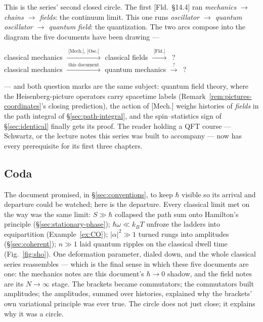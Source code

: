 \documentclass[11pt]{article}
\theoremstyle{plain}
\theoremstyle{definition}
\theoremstyle{remark}
\begin{document}
This is the series' second closed circle. The first
[Fld.\ \S14.4] ran \emph{mechanics $\to$ chains $\to$ fields}: the
continuum limit. This one runs \emph{oscillator $\to$ quantum
oscillator $\to$ quantum field}: the quantization. The two arcs
compose into the diagram the five documents have been drawing ---
\begin{center}
classical mechanics
$\xrightarrow{\;\text{[Mech.], [Osc.]}\;}$
classical fields
$\xrightarrow{\;\text{[Fld.]}\;}$~?
\\[4pt]
classical mechanics
$\xrightarrow{\;\text{this document}\;}$
quantum mechanics
$\xrightarrow{\;?\;}$~?
\end{center}
--- and both question marks are the same subject: quantum field
theory, where the Heisenberg-picture operators carry spacetime
labels (Remark~\ref{rem:pictures-coordinates}'s closing
prediction), the
action of [Mech.] weighs histories of \emph{fields} in the path
integral of \S\ref{sec:path-integral}, and the spin--statistics
sign of \S\ref{sec:identical} finally gets its proof. The reader
holding a QFT course --- Schwartz, or the lecture notes this series
was built to accompany --- now has every prerequisite for
its first three chapters.

\subsection{Coda}
\label{sec:coda}

The document promised, in \S\ref{sec:conventions}, to keep $\hbar$
visible so its arrival and departure could be watched; here is the
departure. Every classical limit met on the way was the same limit:
$S \gg \hbar$ collapsed the path sum onto Hamilton's principle
(\S\ref{sec:stationary-phase}); $\hbar\omega \ll k_BT$ unfroze the
ladders into equipartition (Example~\ref{ex:CO});
$|\alpha|^2 \gg 1$ turned rungs into amplitudes
(\S\ref{sec:coherent}); $n \gg 1$ laid quantum ripples on the
classical dwell time (Fig.~\ref{fig:sho}). One deformation
parameter, dialed down, and the whole classical series
reassembles --- which is the final sense in which these five
documents are one: the mechanics notes are this document's
$\hbar \to 0$ shadow, and the field notes are its
$N \to \infty$ stage. The brackets became commutators; the
commutators built amplitudes; the amplitudes, summed over
histories, explained why the brackets' own variational principle
was ever true. The circle does not just close; it explains why it
was a circle.


\clearpage
\appendix
\end{document}
